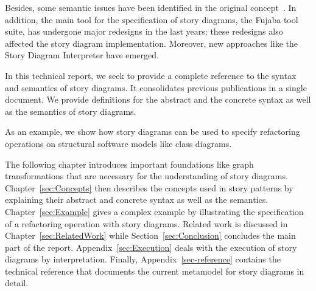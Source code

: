 Besides, some semantic issues have been identified in the original concept~\cite{TMG06}.
In addition, the main tool for the specification of story diagrams, the Fujaba tool suite, has undergone major redesigns in the last years; these redesigns also affected the story diagram implementation.
Moreover, new approaches like the Story Diagram Interpreter have emerged.

In this technical report, we seek to provide a complete reference to the syntax and semantics of story diagrams.
It consolidates previous publications in a single document.
We provide definitions for the abstract and the concrete syntax as well as the semantics of story diagrams.

As an example, we show how story diagrams can be used to specify refactoring operations on structural software models like class diagrams.

The following chapter introduces important foundations like graph transformations that are necessary for the understanding of story diagrams.
Chapter~\ref{sec:Concepts} then describes the concepts used in story patterns by explaining their abstract and concrete syntax as well as the semantics.
Chapter~\ref{sec:Example} gives a complex example by illustrating the specification of a refactoring operation with story diagrams.
Related work is discussed in Chapter~\ref{sec:RelatedWork} while Section~\ref{sec:Conclusion} concludes the main part of the report.
Appendix~\ref{sec:Execution} deals with the execution of story diagrams by interpretation.
Finally, Appendix~\ref{sec-reference} contains the technical reference that documents the current metamodel for story diagrams in detail.